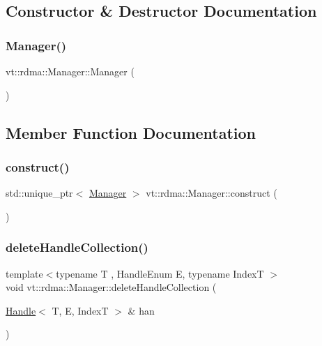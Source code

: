 \subsection{Constructor \& Destructor Documentation}
\mbox{\label{structvt_1_1rdma_1_1_manager_aa5d34a3c5fa988278255562eea5f8aca}} 
\subsubsection{\texorpdfstring{Manager()}{Manager()}}
{\footnotesize\ttfamily vt\+::rdma\+::\+Manager\+::\+Manager (\begin{DoxyParamCaption}{ }\end{DoxyParamCaption})}



\subsection{Member Function Documentation}
\mbox{\label{structvt_1_1rdma_1_1_manager_ab79a91b3feabfc37e6f0b5000e9d3949}} 
\subsubsection{\texorpdfstring{construct()}{construct()}}
{\footnotesize\ttfamily std\+::unique\+\_\+ptr$<$ \hyperlink{structvt_1_1rdma_1_1_manager}{Manager} $>$ vt\+::rdma\+::\+Manager\+::construct (\begin{DoxyParamCaption}{ }\end{DoxyParamCaption})\hspace{0.3cm}{\ttfamily [static]}}

\mbox{\label{structvt_1_1rdma_1_1_manager_a3a1f982e986d58e91837a2b1aa048468}} 
\subsubsection{\texorpdfstring{delete\+Handle\+Collection()}{deleteHandleCollection()}}
{\footnotesize\ttfamily template$<$typename T , Handle\+Enum E, typename IndexT $>$ \\
void vt\+::rdma\+::\+Manager\+::delete\+Handle\+Collection (\begin{DoxyParamCaption}\item[{\hyperlink{structvt_1_1rdma_1_1_handle}{Handle}$<$ T, E, IndexT $>$ \&}]{han }\end{DoxyParamCaption})}



